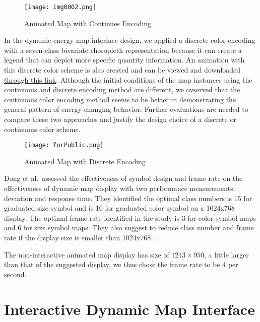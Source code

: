 \begin{figure}[h!]
  \centering
  \texttt{[image: img0002.png]}
  \caption[Animated Map with Continues Encoding]{Animated Map with
    Continues Encoding}
  \label{fig:anime0002}
\end{figure}

In the dynamic energy map interface design, we applied a discrete
color encoding with a seven-class bivariate choropleth representation
because it can create a legend that can depict more specific quantity
information. An animation with this discrete color scheme is also
created and can be viewed and downloaded
\href{http://www.armechxyj.com/energy-mapping.html#redblueAnime3d}{through
  this link}. Although the initial conditions of the map instances
using the continuous and discrete encoding method are different, we
ovserved that the continuous color encoding method seems to be better
in demonstrating the general pattern of energy changing
behavior. Further evaluations are needed to compare these two
approaches and justify the design choice of a discrete or continuous
color scheme.

\begin{figure}[h!]
  \centering
  \texttt{[image: forPublic.png]}
  \caption[Animated Map with Discrete Encoding]{Animated Map with
    Discrete Encoding}
  \label{fig:anime0002}
\end{figure}

Dong et al.\ assessed the effectiveness of symbol design and frame
rate on the effectiveness of dynamic map display with two performance
measurements: deviation and response time. They identified the optimal
class numbers is 15 for graduated size symbol and is 10 for graduated
color symbol on a 1024x768 display. The optimal frame rate identified
in the study is 3 for color symbol maps and 6 for size symbol
maps. They also suggest to reduce class number and frame rate if the
display size is smaller than
1024x768~\cite{doi:10.1559/1523040639298}. 

The non-interactive animated map display has size of
$1213 \times 950$, a little larger than that of the suggested display,
we thus chose the frame rate to be 4 per second.

\section{Interactive Dynamic Map Interface}

